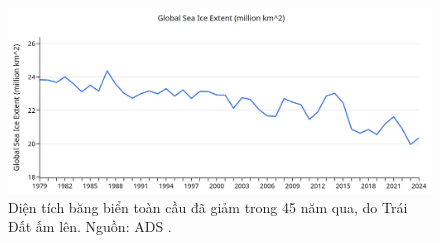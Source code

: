 \documentclass[10pt,twocolumn,letterpaper]{article}
\begin{document}
\begin{figure}[t]
\begin{center}
\includegraphics[width=1\textwidth]{ice.jpg}

\end{center}
   \caption{Diện tích băng biển toàn cầu đã giảm trong 45 năm qua, do Trái Đất ấm lên. Nguồn: ADS \cite{149}.}
\label{fig:24}
\end{figure}

\clearpage
\twocolumn

{\small


}
\end{document}
